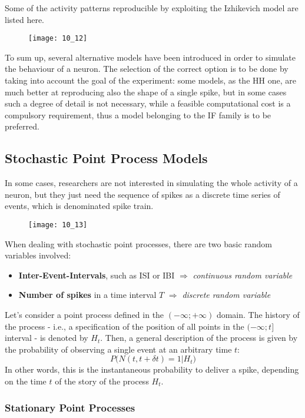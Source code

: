 Some of the activity patterns reproducible by exploiting the Izhikevich model are listed here.
\begin{figure}[H]
    \texttt{[image: 10\_12]}
    \centering
\end{figure}
To sum up, several alternative models have been introduced in order to simulate the behaviour of
a neuron. The selection of the correct option is to be done by taking into account the goal of the
experiment: some models, as the HH one, are much better at reproducing also the shape of a single spike,
but in some cases such a degree of detail is not necessary, while a feasible computational cost is
a compulsory requirement, thus a model belonging to the IF family is to be preferred.

\subsection{Stochastic Point Process Models}
In some cases, researchers are not interested in simulating the whole activity of a neuron, but they
just need the sequence of spikes as a discrete time series of events, which is denominated spike
train.
\begin{figure}[H]
    \texttt{[image: 10\_13]}
    \centering
\end{figure}
When dealing with stochastic point processes, there are two basic random variables involved:
\begin{itemize}
    \item \textbf{Inter-Event-Intervals}, such as ISI or IBI \(\Rightarrow\)
    \textit{continuous random variable}
    \item \textbf{Number of spikes} in a time interval \(T\) \(\Rightarrow\)
    \textit{discrete random variable}
\end{itemize}
Let's consider a point process defined in the \((-\infty;+\infty)\) domain. The history of
the process - i.e., a specification of the position of all points in the \((-\infty;t]\) interval -
is denoted by \(H_{t}\). Then, a general description of the process is given by the probability of
observing a single event at an arbitrary time \(t\):
\begin{equation*}
    P\bigl(N(t,t+\delta{t})=1|H_{t}\bigr)
\end{equation*}
In other words, this is the instantaneous probability to deliver a spike, depending on the time
\(t\) of the story of the process \(H_{t}\).
\subsubsection{Stationary Point Processes}
